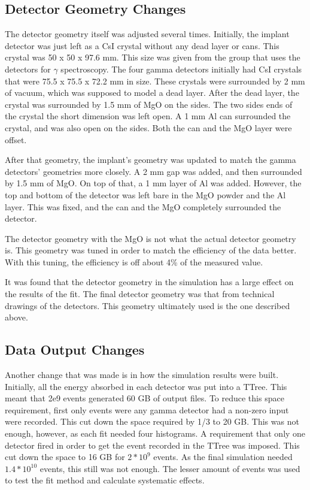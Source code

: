 \documentclass[../MaxHughesThesis.tex]{subfiles}
\begin{document}
\subsection{Detector Geometry Changes}
The detector geometry itself was adjusted several times.
Initially, the implant detector was just left as a CsI crystal without any dead layer or cans.
This crystal was 50 x 50 x 97.6 mm.
This size was given from the group that uses the detectors for $\gamma$ spectroscopy.
The four gamma detectors initially had CsI crystals that were 75.5 x 75.5 x 72.2 mm in size.
These crystals were surrounded by 2 mm of vacuum, which was supposed to model a dead layer.
After the dead layer, the crystal was surrounded by 1.5 mm of MgO on the sides.
The two sides ends of the crystal the short dimension was left open.
A 1 mm Al can surrounded the crystal, and was also open on the sides.
Both the can and the MgO layer were offset.

After that geometry, the implant's geometry was updated to match the gamma detectors' geometries more closely.
A 2 mm gap was added, and then surrounded by 1.5 mm of MgO. 
On top of that, a 1 mm layer of Al was added.
However, the top and bottom of the detector was left bare in the MgO powder and the Al layer.
This was fixed, and the can and the MgO completely surrounded the detector.

The detector geometry with the MgO is not what the actual detector geometry is.
This geometry was tuned in order to match the efficiency of the data better.
With this tuning, the efficiency is off about 4\% of the measured value. 

It was found that the detector geometry in the simulation has a large effect on the results of the fit.
The final detector geometry was that from technical drawings of the detectors.
This geometry ultimately used  is the one described above. 

\subsection{Data Output Changes}
Another change that was made is in how the simulation results were built.
Initially, all the energy absorbed in each detector was put into a TTree.
This meant that 2e9 events generated 60 GB of output files.
To reduce this space requirement, first only events were any gamma detector had a non-zero input were recorded.
This cut down the space required by 1/3 to 20 GB.
This was not enough, however, as each fit needed four histograms.
A requirement that only one detector fired in order to get the event recorded in the TTree was imposed. 
This cut down the space to 16 GB for $2 * 10^{9}$ events.
As the final simulation needed $1.4 * 10^{10}$ events, this still was not enough.
The lesser amount of events was used to test the fit method and calculate systematic effects.
\end{document}
